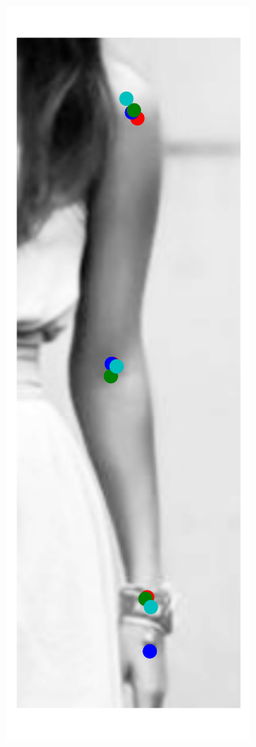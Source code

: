 \begin{figure}[t!]
    \centering
    \begin{subfigure}[b]{0.05\textwidth}
            \includegraphics[width=\textwidth]{resources/Fig_Variance/image_0}

\end{subfigure}
\end{figure}
